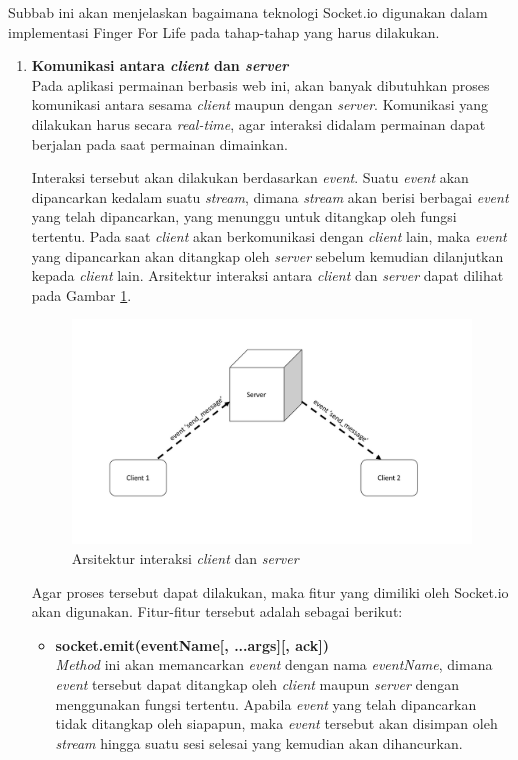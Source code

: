 Subbab ini akan menjelaskan bagaimana teknologi Socket.io digunakan dalam implementasi Finger For Life pada tahap-tahap yang harus dilakukan.
\begin{enumerate}
	\item \textbf{Komunikasi antara \textit{client} dan \textit{server}} \\
	Pada aplikasi permainan berbasis web ini, akan banyak dibutuhkan proses komunikasi antara sesama \textit{client} maupun dengan \textit{server}. Komunikasi yang dilakukan harus secara \textit{real-time}, agar interaksi didalam permainan dapat berjalan pada saat permainan dimainkan.
	
	Interaksi tersebut akan dilakukan berdasarkan \textit{event}. Suatu \textit{event} akan dipancarkan kedalam suatu \textit{stream}, dimana \textit{stream} akan berisi berbagai \textit{event} yang telah dipancarkan, yang menunggu untuk ditangkap oleh fungsi tertentu. Pada saat \textit{client} akan berkomunikasi dengan \textit{client} lain, maka \textit{event} yang dipancarkan akan ditangkap oleh \textit{server} sebelum kemudian dilanjutkan kepada \textit{client} lain. Arsitektur interaksi antara \textit{client} dan \textit{server} dapat dilihat pada Gambar \ref{fig:ars_socketio}.
\begin{figure}[H]
	\centering
	\includegraphics[scale=0.2]{Gambar/ars_socketio}
	\caption{Arsitektur interaksi \textit{client} dan \textit{server}}
	\label{fig:ars_socketio}
\end{figure}	
	Agar proses tersebut dapat dilakukan, maka fitur yang dimiliki oleh Socket.io akan digunakan. Fitur-fitur tersebut adalah sebagai berikut:
	
	\begin{itemize}
		\item \textbf{socket.emit(eventName[, ...args][, ack])} \\ 
		\textit{Method} ini akan memancarkan \textit{event} dengan nama \textit{eventName}, dimana \textit{event} tersebut dapat ditangkap oleh \textit{client} maupun \textit{server} dengan menggunakan fungsi tertentu. Apabila \textit{event} yang telah dipancarkan tidak ditangkap oleh siapapun, maka \textit{event} tersebut akan disimpan oleh \textit{stream} hingga suatu sesi selesai yang kemudian akan dihancurkan.
		

\end{itemize}
\end{enumerate}

